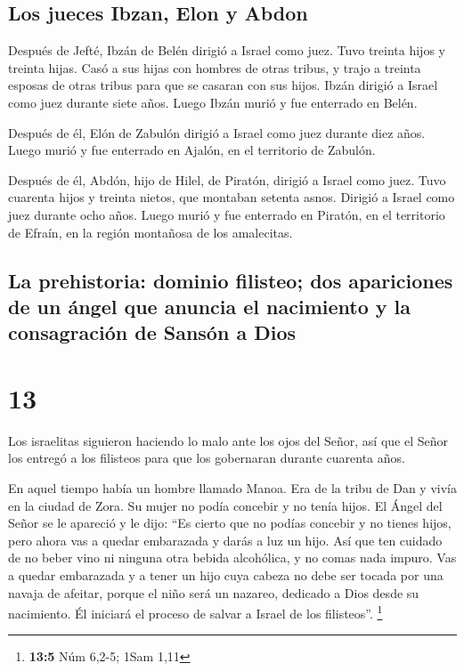 \hypertarget{los-jueces-ibzan-elon-y-abdon}{%
\subsection{Los jueces Ibzan, Elon y
Abdon}\label{los-jueces-ibzan-elon-y-abdon}}

 Después de Jefté, Ibzán de Belén dirigió a Israel como
juez.  Tuvo treinta hijos y treinta hijas. Casó a sus
hijas con hombres de otras tribus, y trajo a treinta esposas de otras
tribus para que se casaran con sus hijos. Ibzán dirigió a Israel como
juez durante siete años.  Luego Ibzán murió y fue
enterrado en Belén.

 Después de él, Elón de Zabulón dirigió a Israel como
juez durante diez años.  Luego murió y fue enterrado en
Ajalón, en el territorio de Zabulón.

 Después de él, Abdón, hijo de Hilel, de Piratón, dirigió
a Israel como juez.  Tuvo cuarenta hijos y treinta
nietos, que montaban setenta asnos. Dirigió a Israel como juez durante
ocho años.  Luego murió y fue enterrado en Piratón, en el
territorio de Efraín, en la región montañosa de los amalecitas.

\hypertarget{la-prehistoria-dominio-filisteo-dos-apariciones-de-un-uxe1ngel-que-anuncia-el-nacimiento-y-la-consagraciuxf3n-de-sansuxf3n-a-dios}{%
\subsection{La prehistoria: dominio filisteo; dos apariciones de un
ángel que anuncia el nacimiento y la consagración de Sansón a
Dios}\label{la-prehistoria-dominio-filisteo-dos-apariciones-de-un-uxe1ngel-que-anuncia-el-nacimiento-y-la-consagraciuxf3n-de-sansuxf3n-a-dios}}

\hypertarget{section-12}{%
\section{13}\label{section-12}}

 Los israelitas siguieron haciendo lo malo ante los ojos
del Señor, así que el Señor los entregó a los filisteos para que los
gobernaran durante cuarenta años.

 En aquel tiempo había un hombre llamado Manoa. Era de la
tribu de Dan y vivía en la ciudad de Zora. Su mujer no podía concebir y
no tenía hijos.  El Ángel del Señor se le apareció y le
dijo: ``Es cierto que no podías concebir y no tienes hijos, pero ahora
vas a quedar embarazada y darás a luz un hijo.  Así que
ten cuidado de no beber vino ni ninguna otra bebida alcohólica, y no
comas nada impuro.  Vas a quedar embarazada y a tener un
hijo cuya cabeza no debe ser tocada por una navaja de afeitar, porque el
niño será un nazareo, dedicado a Dios desde su nacimiento. Él iniciará
el proceso de salvar a Israel de los filisteos''. \footnote{\textbf{13:5}
  Núm 6,2-5; 1Sam 1,11}

